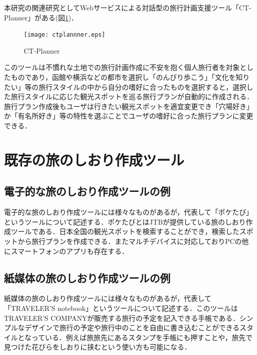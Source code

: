 \documentclass{funthesis}
\begin{document}
本研究の関連研究としてWebサービスによる対話型の旅行計画支援ツール「CT-Planner」\cite{CTPlanner}がある(図\ref{LCT})．

\begin{figure}[htpb]
\begin{center}
\texttt{[image: ctplannner.eps]}
\end{center}
\caption{CT-Planner}
\label{LCT}
\end{figure}

このツールは不慣れな土地での旅行計画作成に不安を抱く個人旅行者を対象としたものであり，函館や横浜などの都市を選択し「のんびり歩こう」「文化を知りたい」等の旅行スタイルの中から自分の嗜好に合ったものを選択すると，選択した旅行スタイルに応じた観光スポットを巡る旅行プランが自動的に作成される．旅行プラン作成後もユーザは行きたい観光スポットを適宜変更でき「穴場好き」か「有名所好き」等の特性を選ぶことでユーザの嗜好に合った旅行プランに変更できる．


\section{既存の旅のしおり作成ツール}

\subsection{電子的な旅のしおり作成ツールの例}
電子的な旅のしおり作成ツールには様々なものがあるが，代表して「ポケたび」\cite{poketrip}というツールについて記述する．ポケたびとはJTBが提供している旅のしおり作成ツールである．日本全国の観光スポットを検索することができ，検索したスポットから旅行プランを作成できる．またマルチデバイスに対応しておりPCの他にスマートフォンのアプリも存在する．

\subsection{紙媒体の旅のしおり作成ツールの例}
紙媒体の旅のしおり作成ツールには様々なものがあるが，代表して「TRAVELER'S notebook」\cite{traver}というツールについて記述する．このツールはTRAVELER'S COMPANYが販売する旅行の予定を記入できる手帳である．シンプルなデザインで旅行の予定や旅行中のことを自由に書き込むことができるスタイルとなっている．例えば旅旅先にあるスタンプを手帳にも押すことや，旅先で見つけた花びらをしおりに挟むという使い方も可能になる．
\end{document}
